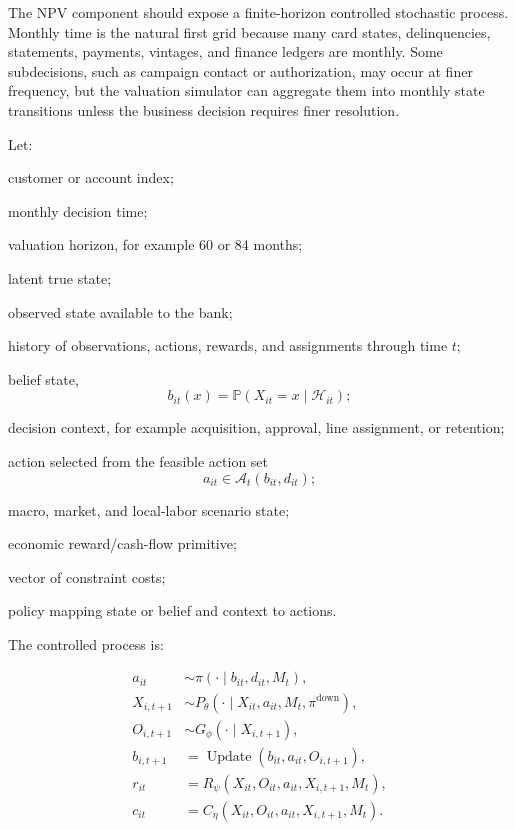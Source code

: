 \documentclass[
]{article}
\newcommand{\Prob}{\mathbb{P}}
\begin{document}
The NPV component should expose a finite-horizon controlled stochastic
process. Monthly time is the natural first grid because many card
states, delinquencies, statements, payments, vintages, and finance
ledgers are monthly. Some subdecisions, such as campaign contact or
authorization, may occur at finer frequency, but the valuation simulator
can aggregate them into monthly state transitions unless the business
decision requires finer resolution.

Let:

\begin{description}[leftmargin=2.4cm,style=nextline]
\item[$i$] customer or account index;
\item[$t$] monthly decision time;
\item[$H$] valuation horizon, for example 60 or 84 months;
\item[$X_{it}$] latent true state;
\item[$O_{it}$] observed state available to the bank;
\item[$\mathcal{H}_{it}$] history of observations, actions, rewards, and assignments through time $t$;
\item[$b_{it}$] belief state,
  \[
    b_{it}(x) = \Prob\!\left(X_{it}=x \mid \mathcal{H}_{it}\right);
  \]
\item[$d_{it}$] decision context, for example acquisition, approval, line assignment, or retention;
\item[$a_{it}$] action selected from the feasible action set
  \[
    a_{it}\in\mathcal{A}_{t}(b_{it},d_{it});
  \]
\item[$M_t$] macro, market, and local-labor scenario state;
\item[$r_{it}$] economic reward/cash-flow primitive;
\item[$c_{it}$] vector of constraint costs;
\item[$\pi$] policy mapping state or belief and context to actions.
\end{description}

The controlled process is:

\begin{align}
  a_{it} &\sim \pi(\cdot \mid b_{it},d_{it},M_t), \label{eq:policy-draw}\\
  X_{i,t+1} &\sim P_{\theta}\!\left(\cdot \mid X_{it},a_{it},M_t,\pi^{\mathrm{down}}\right), \label{eq:latent-transition}\\
  O_{i,t+1} &\sim G_{\phi}\!\left(\cdot \mid X_{i,t+1}\right), \label{eq:observation}\\
  b_{i,t+1} &= \operatorname{Update}\!\left(b_{it},a_{it},O_{i,t+1}\right), \label{eq:belief-update}\\
  r_{it} &= R_{\psi}\!\left(X_{it},O_{it},a_{it},X_{i,t+1},M_t\right), \label{eq:reward-map}\\
  c_{it} &= C_{\eta}\!\left(X_{it},O_{it},a_{it},X_{i,t+1},M_t\right). \label{eq:constraint-map}
\end{align}
\end{document}
